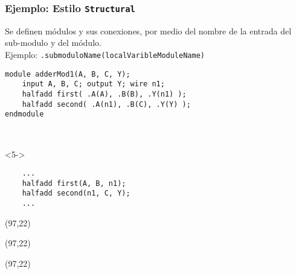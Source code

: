 \documentclass[aspectratio=169]{beamer}
\begin{document}
\begin{frame}[fragile,t]
    \frametitle{Ejemplo: Estilo \texttt{Structural}}
    \small Se definen módulos y sus conexiones, por medio del nombre de la entrada del sub-modulo y del módulo.\\
    \vspace{0.4cm}
    \textcolor{verdeuca}{Ejemplo: \texttt{.submoduloName(localVaribleModuleName)}}\\
    \vspace{0.3cm}
    \begin{minipage}{8.2cm}
\begin{lstlisting}
module adderMod1(A, B, C, Y);
    input A, B, C; output Y; wire n1;
    halfadd first( .A(A), .B(B), .Y(n1) );
    halfadd second( .A(n1), .B(C), .Y(Y) );
endmodule
\end{lstlisting}
    \end{minipage}\\
    \vspace{0.2cm}
    \vspace{0.2cm}
    \begin{minipage}{8.2cm}
\begin{onlyenv}<5->  
\begin{lstlisting}
    ...
    halfadd first(A, B, n1);
    halfadd second(n1, C, Y);
    ...
\end{lstlisting}
\end{onlyenv}
    \end{minipage}
    \begin{textblock}{65}(97,22)  \end{textblock}
    \begin{textblock}{65}(97,22)  \end{textblock}
    \begin{textblock}{65}(97,22)  \end{textblock}
\end{frame}
\end{document}

